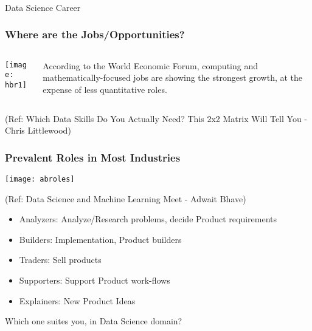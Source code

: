 \begin{frame}[fragile]\frametitle{}
\begin{center}
{\Large Data Science Career}
\end{center}
\end{frame}

\begin{frame}[fragile]\frametitle{Where are the Jobs/Opportunities?}
 
   \begin{columns}[t]
    \begin{column}{0.6\linewidth}
\begin{center}
\texttt{[image: hbr1]}
\end{center}
    \end{column}
    \begin{column}{0.4\linewidth}
	 According to the World Economic Forum, computing and mathematically-focused jobs are showing the strongest growth, at the expense of less quantitative roles.
    \end{column}
  \end{columns}
 

{\tiny (Ref: Which Data Skills Do You Actually Need? This 2x2 Matrix Will Tell You - Chris Littlewood)}
\end{frame}

\begin{frame}[fragile]\frametitle{Prevalent Roles in Most Industries}
\begin{center}
\texttt{[image: abroles]}
\end{center}
{\tiny (Ref: Data Science and Machine Learning Meet - Adwait Bhave)}
\begin{itemize}
\item Analyzers: Analyze/Research problems, decide Product requirements
\item Builders: Implementation, Product builders
\item Traders: Sell products
\item Supporters: Support Product work-flows
\item Explainers: New Product Ideas
\end{itemize}
Which one suites you, in Data Science domain?
\end{frame}

